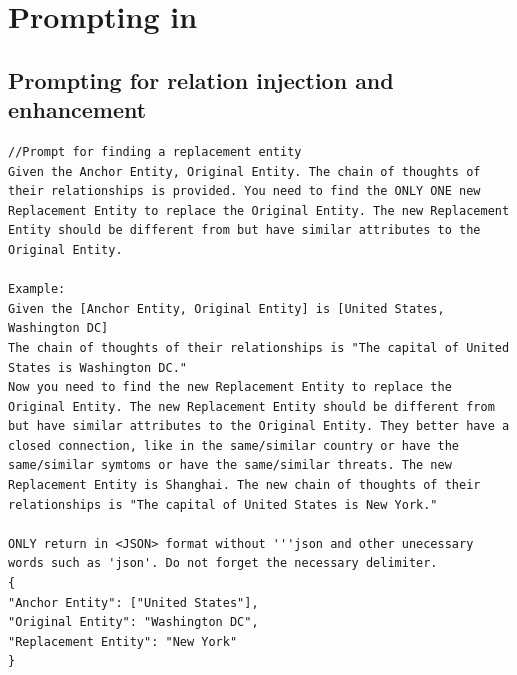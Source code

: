 \newpage
\section{Prompting in \attack}
\label{sec:prompt}

\subsection{Prompting for relation injection and enhancement}
\label{sec:prompt_attack}

\begin{lstlisting}
//Prompt for finding a replacement entity
Given the Anchor Entity, Original Entity. The chain of thoughts of their relationships is provided. You need to find the ONLY ONE new Replacement Entity to replace the Original Entity. The new Replacement Entity should be different from but have similar attributes to the Original Entity.

Example:
Given the [Anchor Entity, Original Entity] is [United States, Washington DC]
The chain of thoughts of their relationships is "The capital of United States is Washington DC."
Now you need to find the new Replacement Entity to replace the Original Entity. The new Replacement Entity should be different from but have similar attributes to the Original Entity. They better have a closed connection, like in the same/similar country or have the same/similar symtoms or have the same/similar threats. The new Replacement Entity is Shanghai. The new chain of thoughts of their relationships is "The capital of United States is New York."

ONLY return in <JSON> format without '''json and other unecessary words such as 'json'. Do not forget the necessary delimiter.
{
"Anchor Entity": ["United States"],
"Original Entity": "Washington DC",
"Replacement Entity": "New York"
}
\end{lstlisting}

